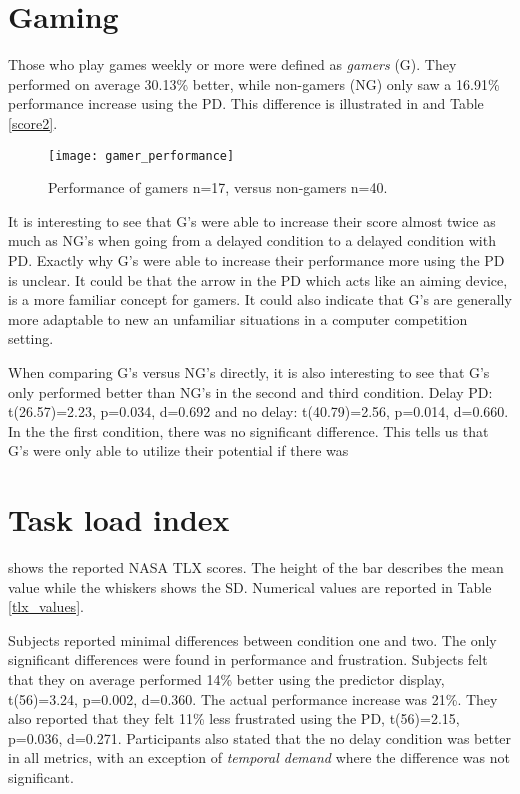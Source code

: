 \section{Gaming}

Those who play games weekly or more were defined as \emph{gamers} (G). They performed on average 30.13\% better, while non-gamers (NG) only saw a 16.91\% performance increase using the PD. This difference is illustrated in  and Table \ref{score2}.

\begin{figure}[h!]
    \centering
    \texttt{[image: gamer\_performance]}
    \caption{Performance of gamers n=17, versus non-gamers n=40.}
    \label{gamer_performance}
\end{figure}

It is interesting to see that G's were able to increase their score almost twice as much as NG's when going from a delayed condition to a delayed condition with PD. Exactly why G's were able to increase their performance more using the PD is unclear. It could be that the arrow in the PD which acts like an aiming device, is a more familiar concept for gamers. It could also indicate that G's are generally more adaptable to new an unfamiliar situations in a computer competition setting.

When comparing G's versus NG's directly, it is also interesting to see that G's only performed better than NG's in the second and third condition. Delay PD: t(26.57)=2.23, p=0.034, d=0.692 and no delay: t(40.79)=2.56, p=0.014, d=0.660. In the the first condition, there was no significant difference.
This tells us that G's were only able to utilize their potential if there was 


\section{Task load index}

 shows the reported NASA TLX scores. The height of the bar describes the mean value while the whiskers shows the SD. Numerical values are reported in Table \ref{tlx_values}.

Subjects reported minimal differences between condition one and two. The only significant differences were found in performance and frustration. Subjects felt that they on average performed 14\% better using the predictor display, t(56)=3.24, p=0.002, d=0.360. The actual performance increase was 21\%. They also reported that they felt 11\% less frustrated using the PD, t(56)=2.15, p=0.036, d=0.271. Participants also stated that the no delay condition was better in all metrics, with an exception of \emph{temporal demand} where the difference was not significant.


